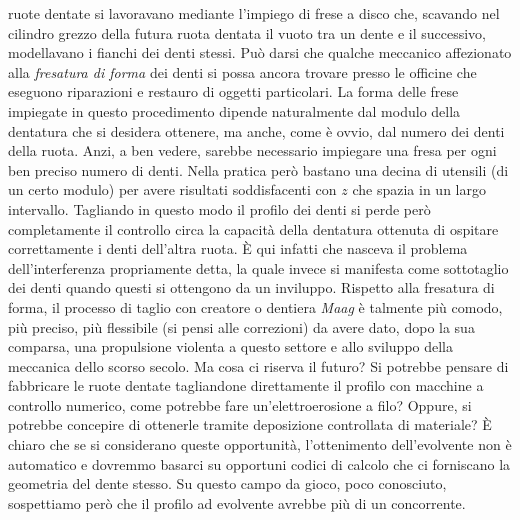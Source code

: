 ruote dentate si lavoravano mediante l'impiego di frese a disco
che, scavando nel cilindro grezzo della futura ruota dentata
il vuoto tra un dente e il successivo,
modellavano i fianchi dei denti stessi.
Pu\`o darsi che qualche meccanico affezionato
alla {\em fresatura di forma}
dei denti si possa ancora trovare presso
le officine che eseguono riparazioni e restauro di oggetti particolari.
La forma delle frese impiegate in questo procedimento
dipende naturalmente dal modulo della dentatura che si desidera ottenere,
ma anche, come \`e ovvio, dal numero dei denti della ruota.
Anzi, a ben vedere, sarebbe necessario impiegare 
una fresa per ogni ben preciso numero di denti.
Nella pratica per\`o bastano una decina di
utensili (di un certo modulo) per avere risultati soddisfacenti con
$z$ che spazia in un largo intervallo. Tagliando in
questo modo  il profilo dei denti
si perde per\`o completamente il controllo circa la 
capacit\`a della dentatura ottenuta di ospitare correttamente i denti
dell'altra ruota. \`E qui infatti che nasceva il problema dell'interferenza
propriamente detta,
la quale invece si manifesta come sottotaglio
dei denti quando questi si ottengono da un inviluppo. Rispetto alla
fresatura di forma,
il processo di taglio con creatore o dentiera {\em Maag} \`e
talmente pi\`u comodo, pi\`u preciso, pi\`u flessibile (si pensi
alle correzioni) da avere dato, dopo la sua comparsa,
una propulsione violenta a questo settore e allo sviluppo
della meccanica dello scorso secolo. Ma
cosa ci riserva il futuro? Si potrebbe pensare di fabbricare le ruote
dentate tagliandone direttamente il profilo con macchine
a controllo numerico, come potrebbe fare un'elettroerosione a filo?
Oppure, si potrebbe concepire di ottenerle tramite deposizione controllata
di materiale?  \`E chiaro che se si considerano queste opportunit\`a,
l'ottenimento dell'evolvente non \`e automatico e dovremmo
basarci su opportuni codici di calcolo che ci forniscano la geometria del
dente stesso. Su questo campo da gioco, poco conosciuto,
sospettiamo per\`o che il profilo ad evolvente
avrebbe pi\`u di un concorrente.

\endinput
